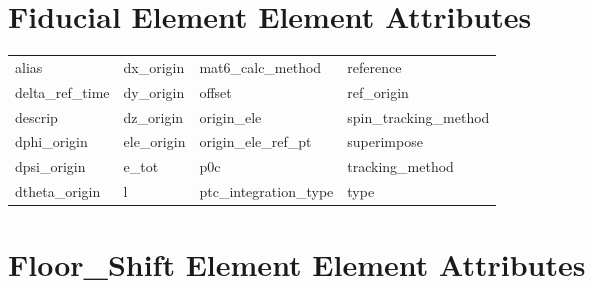  \section{Fiducial Element Element Attributes}
 \label{s:list.fiducial}
 
 \begin{tabular}{llll} \toprule
alias                       & dx_origin                   & mat6_calc_method            & reference                   \\
delta_ref_time              & dy_origin                   & offset                      & ref_origin                  \\
descrip                     & dz_origin                   & origin_ele                  & spin_tracking_method        \\
dphi_origin                 & ele_origin                  & origin_ele_ref_pt           & superimpose                 \\
dpsi_origin                 & e_tot                       & p0c                         & tracking_method             \\
dtheta_origin               & l                           & ptc_integration_type        & type                        \\
 \bottomrule
 \end{tabular}
 \vfill
 
 \section{Floor_Shift Element Element Attributes}
 \label{s:list.floor.shift}
 
